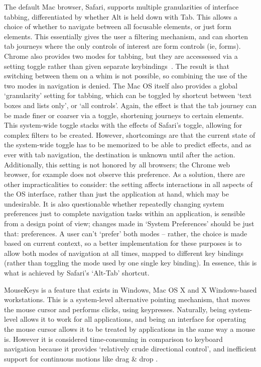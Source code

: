 \documentclass[a4paper, 11pt]{article}
\begin{document}
The default Mac browser, Safari, supports multiple granularities of interface tabbing, differentiated by whether Alt is held down with Tab\cite{safaria11y}. This allows a choice of whether to navigate between all focusable elements, or just form elements. This essentially gives the user a filtering mechanism, and can shorten tab journeys where the only controls of interest are form controls (ie, forms). Chrome also provides two modes for tabbing, but they are accessessed via a setting toggle rather than given separate keybindings~\cite{browserkeyboardaccess}. The result is that switching between them on a whim is not possible, so combining the use of the two modes in navigation is denied.
The Mac OS itself also provides a global `granularity' setting for tabbing, which can be toggled by shortcut between `text boxes and lists only', or `all controls'\cite{macshortcuts}. Again, the effect is that the tab journey can be made finer or coarser via a toggle, shortening journeys to certain elements. This system-wide toggle stacks with the effects of Safari's toggle, allowing for complex filters to be created. However, shortcomings are that the current state of the system-wide toggle has to be memorized to be able to predict effects, and as ever with tab navigation, the destination is unknown until after the action. Additionally, this setting is not honored by all browsers; the Chrome web browser, for example does not observe this preference\cite{browserkeyboardaccess}.
As a solution, there are other impracticalities to consider: the setting affects interactions in all aspects of the OS interface, rather than just the application at hand, which may be undesirable. It is also questionable whether repeatedly changing system preferences just to complete navigation tasks within an application, is sensible from a design point of view; changes made in `System Preferences' should be just that: preferences. A user can't `prefer' both modes -- rather, the choice is made based on current context, so a better implementation for these purposes is to allow both modes of navigation at all times, mapped to different key bindings (rather than toggling the mode used by one single key binding). In essence, this is what is achieved by Safari's `Alt-Tab' shortcut.

MouseKeys is a feature that exists in Windows, Mac OS X and X Windows-based workstations. This is a system-level alternative pointing mechanism, that moves the mouse cursor and performs clicks, using keypresses. Naturally, being system-level allows it to work for all applications, and being an interface for operating the mouse cursor allows it to be treated by applications in the same way a mouse is. However it is considered time-consuming in comparison to keyboard navigation because it provides `relatively crude directional control', and inefficient support for continuous motions like drag \& drop \cite{bergman1995towards}.
\end{document}

